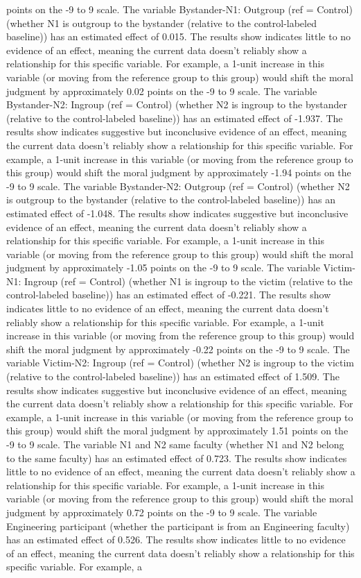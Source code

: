 \documentclass[11pt]{article}
\begin{document}
points on the -9 to 9 scale. The variable Bystander-N1: Outgroup (ref = Control) (whether N1 is outgroup to the bystander (relative to the control-labeled baseline)) has an estimated effect of 0.015. The results show indicates little to no evidence of an effect, meaning the current data doesn't reliably show a relationship for this specific variable. For example, a 1-unit increase in this variable (or moving from the reference group to this group) would shift the moral judgment by approximately 0.02 points on the -9 to 9 scale. The variable Bystander-N2: Ingroup (ref = Control) (whether N2 is ingroup to the bystander (relative to the control-labeled baseline)) has an estimated effect of -1.937. The results show indicates suggestive but inconclusive evidence of an effect, meaning the current data doesn't reliably show a relationship for this specific variable. For example, a 1-unit increase in this variable (or moving from the reference group to this group) would shift the moral judgment by approximately -1.94 points on the -9 to 9 scale. The variable Bystander-N2: Outgroup (ref = Control) (whether N2 is outgroup to the bystander (relative to the control-labeled baseline)) has an estimated effect of -1.048. The results show indicates suggestive but inconclusive evidence of an effect, meaning the current data doesn't reliably show a relationship for this specific variable. For example, a 1-unit increase in this variable (or moving from the reference group to this group) would shift the moral judgment by approximately -1.05 points on the -9 to 9 scale. The variable Victim-N1: Ingroup (ref = Control) (whether N1 is ingroup to the victim (relative to the control-labeled baseline)) has an estimated effect of -0.221. The results show indicates little to no evidence of an effect, meaning the current data doesn't reliably show a relationship for this specific variable. For example, a 1-unit increase in this variable (or moving from the reference group to this group) would shift the moral judgment by approximately -0.22 points on the -9 to 9 scale. The variable Victim-N2: Ingroup (ref = Control) (whether N2 is ingroup to the victim (relative to the control-labeled baseline)) has an estimated effect of 1.509. The results show indicates suggestive but inconclusive evidence of an effect, meaning the current data doesn't reliably show a relationship for this specific variable. For example, a 1-unit increase in this variable (or moving from the reference group to this group) would shift the moral judgment by approximately 1.51 points on the -9 to 9 scale. The variable N1 and N2 same faculty (whether N1 and N2 belong to the same faculty) has an estimated effect of 0.723. The results show indicates little to no evidence of an effect, meaning the current data doesn't reliably show a relationship for this specific variable. For example, a 1-unit increase in this variable (or moving from the reference group to this group) would shift the moral judgment by approximately 0.72 points on the -9 to 9 scale. The variable Engineering participant (whether the participant is from an Engineering faculty) has an estimated effect of 0.526. The results show indicates little to no evidence of an effect, meaning the current data doesn't reliably show a relationship for this specific variable. For example, a 
\end{document}
